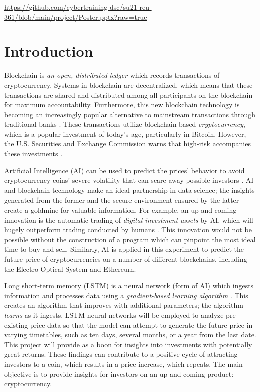 \documentclass[acmtog,authorversion]{acmart}
\begin{document}
\href{Miami Dade College School of Science 10th Annual STEM Research Symposium 2021 Poster}{https://github.com/cybertraining-dsc/su21-reu-361/blob/main/project/Poster.pptx?raw=true}



\section{Introduction}

Blockchain is {\em an open, distributed ledger} which records transactions of cryptocurrency. Systems in blockchain are decentralized, which means that these transactions are shared and distributed among all participants on the blockchain for maximum accountability. Furthermore, this new blockchain technology is becoming an increasingly popular alternative to mainstream transactions through traditional banks \cite{c-2}. These transactions utilize blockchain-based {\em cryptocurrency}, which is a popular investment of today's age, particularly in Bitcoin. However, the U.S. Securities and Exchange Commission warns that high-risk accompanies these investments \cite{c-1}. 

Artificial Intelligence (AI) can be used to predict the prices' behavior to avoid cryptocurrency coins' severe volatility that can scare away possible investors \cite{c-3}. AI and blockchain technology make an ideal partnership in data science; the insights generated from the former and the secure environment ensured by the latter create a goldmine for valuable information. For example, an up-and-coming innovation is the automatic trading of {\em digital investment assets} by AI, which will hugely outperform trading conducted by humans \cite{c-5}. This innovation would not be possible without the construction of a program which can pinpoint the most ideal time to buy and sell. Similarly, AI is applied in this experiment to predict the future price of cryptocurrencies on a number of different blockchains, including the Electro-Optical System and Ethereum. 

Long short-term memory (LSTM) is a neural network (form of AI) which ingests information and processes data using a {\em gradient-based learning algorithm} \cite{c-6}. This creates an algorithm that improves with additional parameters; the algorithm {\em learns} as it ingests. LSTM neural networks will be employed to analyze pre-existing price data so that the model can attempt to generate the future price in varying timetables, such as ten days, several months, or a year from the last date. This project will provide as a boon for insights into investments with potentially great returns. These findings can contribute to a positive cycle of attracting investors to a coin, which results in a price increase, which repeats. The main objective is to provide insights for investors on an up-and-coming product: cryptocurrency.
\end{document}
